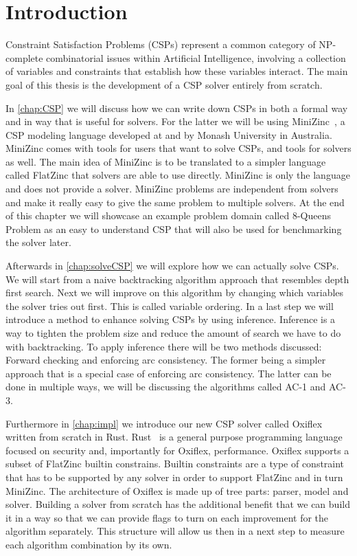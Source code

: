 
\chapter{Introduction}

Constraint Satisfaction Problems (CSPs) represent a common category of NP-complete combinatorial issues within Artificial Intelligence, involving a collection of variables and constraints that establish how these variables interact. The main goal of this thesis is the development of a CSP solver entirely from scratch.

In \cref{chap:CSP} we will discuss how we can write down CSPs in both a formal way and in way that is useful for solvers. For the latter we will be using MiniZinc~\cite{minizinc:2007}, a CSP modeling language developed at and by Monash University in Australia. MiniZinc comes with tools for users that want to solve CSPs, and tools for solvers as well. The main idea of MiniZinc is to be translated to a simpler language called FlatZinc that solvers are able to use directly. MiniZinc is only the language and does not provide a solver. MiniZinc problems are independent from solvers and make it really easy to give the same problem to multiple solvers. At the end of this chapter we will showcase an example problem domain called 8-Queens Problem as an easy to understand CSP that will also be used for benchmarking the solver later.

Afterwards in \cref{chap:solveCSP} we will explore how we can actually solve CSPs. We will start from a naive backtracking algorithm approach that resembles depth first search. Next we will improve on this algorithm by changing which variables the solver tries out first. This is called variable ordering. In a last step we will introduce a method to enhance solving CSPs by using inference. Inference is a way to tighten the problem size and reduce the amount of search we have to do with backtracking. To apply inference there will be two methods discussed: Forward checking and enforcing arc consistency. The former being a simpler approach that is a special case of enforcing arc consistency. The latter can be done in multiple ways, we will be discussing the algorithms called AC-1 and AC-3.

Furthermore in \cref{chap:impl} we introduce our new CSP solver called Oxiflex written from scratch in Rust. Rust~\cite{rust:2014} is a general purpose programming language focused on security and, importantly for Oxiflex, performance. Oxiflex supports a subset of FlatZinc builtin constrains. Builtin constraints are a type of constraint that has to be supported by any solver in order to support FlatZinc and in turn MiniZinc. The architecture of Oxiflex is made up of tree parts: parser, model and solver. Building a solver from scratch has the additional benefit that we can build it in a way so that we can provide flags to turn on each improvement for the algorithm separately. This structure will allow us then in a next step to measure each algorithm combination by its own.

